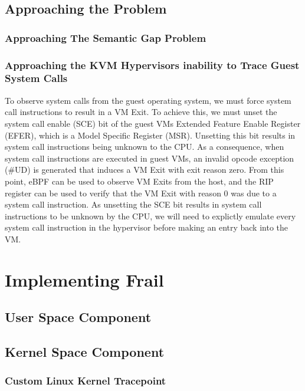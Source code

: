 \documentclass{report}
\begin{document}
\begin{spacing}{1.5}
\section{Approaching the Problem}


\subsection{Approaching The Semantic Gap Problem}



\subsection{Approaching the KVM Hypervisors inability to Trace Guest System Calls}

{\large
To observe system calls from the guest operating system, we must force system call instructions to result in a VM Exit. To achieve this, we must unset the system call enable (SCE) bit of the guest VMs Extended Feature Enable Register (EFER), which is a Model Specific Register (MSR). Unsetting this bit results in system call instructions being unknown to the CPU. As a consequence, when system call instructions are executed in guest VMs, an invalid opcode exception (\#UD) is generated that induces a VM Exit with exit reason zero. From this point, eBPF can be used to observe VM Exits from the host, and the RIP register can be used to verify that the VM Exit with reason 0 was due to a system call instruction. As unsetting the SCE bit results in system call instructions to be unknown by the CPU, we will need to explictly emulate every system call instruction in the hypervisor before making an entry back into the VM.
\newline
}

\chapter{Implementing Frail}

\section{User Space Component}
\section{Kernel Space Component}
\subsection{Custom Linux Kernel Tracepoint}

\end{spacing}
\end{document}

